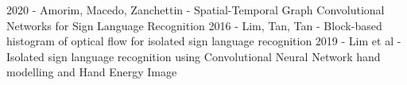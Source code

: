 
2020 - Amorim, Macedo, Zanchettin - Spatial-Temporal Graph Convolutional Networks for Sign Language Recognition
    2016 - Lim, Tan, Tan - Block-based histogram of optical flow for isolated sign language recognition
2019 - Lim et al - Isolated sign language recognition using Convolutional Neural Network hand modelling and Hand Energy Image